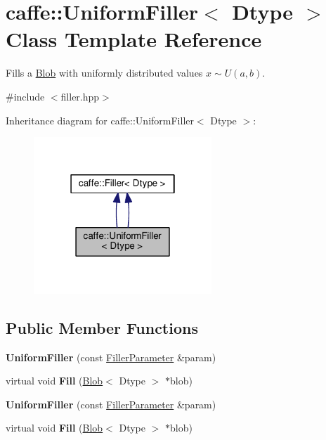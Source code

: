 \hypertarget{classcaffe_1_1_uniform_filler}{}\section{caffe\+:\+:Uniform\+Filler$<$ Dtype $>$ Class Template Reference}
\label{classcaffe_1_1_uniform_filler}


Fills a \mbox{\hyperlink{classcaffe_1_1_blob}{Blob}} with uniformly distributed values $ x\sim U(a, b) $.  




{\ttfamily \#include $<$filler.\+hpp$>$}



Inheritance diagram for caffe\+:\+:Uniform\+Filler$<$ Dtype $>$\+:
\nopagebreak
\begin{figure}[H]
\begin{center}
\leavevmode
\includegraphics[width=190pt]{classcaffe_1_1_uniform_filler__inherit__graph}
\end{center}
\end{figure}
\subsection*{Public Member Functions}
\begin{DoxyCompactItemize}
\item 
\mbox{\label{classcaffe_1_1_uniform_filler_a54ba034191d145314cf44d158c14195a}} 
{\bfseries Uniform\+Filler} (const \mbox{\hyperlink{classcaffe_1_1_filler_parameter}{Filler\+Parameter}} \&param)
\item 
\mbox{\label{classcaffe_1_1_uniform_filler_ae874946013d1b9ec4ede19786da34a9d}} 
virtual void {\bfseries Fill} (\mbox{\hyperlink{classcaffe_1_1_blob}{Blob}}$<$ Dtype $>$ $\ast$blob)
\item 
\mbox{\label{classcaffe_1_1_uniform_filler_a54ba034191d145314cf44d158c14195a}} 
{\bfseries Uniform\+Filler} (const \mbox{\hyperlink{classcaffe_1_1_filler_parameter}{Filler\+Parameter}} \&param)
\item 
\mbox{\label{classcaffe_1_1_uniform_filler_ae874946013d1b9ec4ede19786da34a9d}} 
virtual void {\bfseries Fill} (\mbox{\hyperlink{classcaffe_1_1_blob}{Blob}}$<$ Dtype $>$ $\ast$blob)
\end{DoxyCompactItemize}
